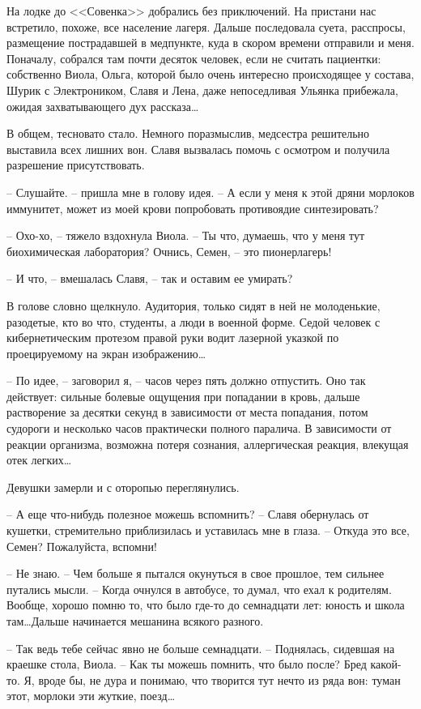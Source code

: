 \documentclass[a4paper]{book}
\begin{document}
На лодке до <<Совенка>> добрались без приключений. На пристани нас встретило, похоже, все население лагеря. Дальше последовала суета, расспросы, размещение пострадавшей в медпункте, куда в скором времени отправили и меня. Поначалу, собрался там почти десяток человек, если не считать пациентки: собственно Виола, Ольга, которой было очень интересно происходящее у состава, Шурик с Электроником, Славя и Лена, даже непоседливая Ульянка прибежала, ожидая захватывающего дух рассказа\ldots 

В общем, тесновато стало. Немного поразмыслив, медсестра решительно выставила всех лишних вон. Славя вызвалась помочь с осмотром и получила разрешение присутствовать. 

-- Слушайте. -- пришла мне в голову идея. -- А если у меня к этой дряни морлоков иммунитет, может из моей крови попробовать противоядие синтезировать? 

-- Охо-хо, -- тяжело вздохнула Виола. -- Ты что, думаешь, что у меня тут биохимическая лаборатория? Очнись, Семен, -- это пионерлагерь!

-- И что, -- вмешалась Славя, -- так и оставим ее умирать?

В голове словно щелкнуло. Аудитория, только сидят в ней не молоденькие, разодетые, кто во что, студенты, а люди в военной форме. Седой человек с кибернетическим протезом правой руки водит лазерной указкой по проецируемому на экран изображению\ldots

-- По идее, -- заговорил я, -- часов через пять должно отпустить. Оно так действует: сильные болевые ощущения при попадании в кровь, дальше растворение за десятки секунд в зависимости от места попадания, потом судороги и несколько часов практически полного паралича. В зависимости от реакции организма, возможна потеря сознания, аллергическая реакция, влекущая отек легких\ldots

Девушки замерли и с оторопью переглянулись.

-- А еще что-нибудь полезное можешь вспомнить? -- Славя обернулась от кушетки, стремительно приблизилась и уставилась мне в глаза. -- Откуда это все, Семен? Пожалуйста, вспомни!

-- Не знаю. -- Чем больше я пытался окунуться в свое прошлое, тем сильнее путались мысли. -- Когда очнулся в автобусе, то думал, что ехал к родителям. Вообще, хорошо помню то, что было где-то до семнадцати лет: юность и школа там\ldots Дальше начинается мешанина всякого разного.

-- Так ведь тебе сейчас явно не больше семнадцати. -- Поднялась, сидевшая на краешке стола, Виола. -- Как ты можешь помнить, что было после? Бред какой-то. Я, вроде бы, не дура и понимаю, что творится тут нечто из ряда вон: туман этот, морлоки эти жуткие, поезд\ldots
\end{document}
